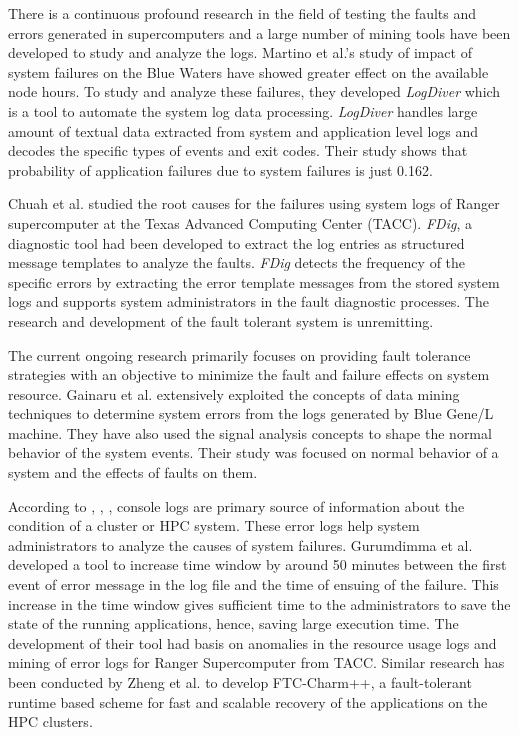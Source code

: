 \documentclass[10pt]{ruthesis}
\begin{document}
There is a continuous profound research in the field of testing the faults and errors generated in supercomputers and a large number of mining tools have been developed to study and analyze the logs. Martino et al.'s \cite{ref6} study of impact of system failures on the Blue Waters have showed greater effect on the available node hours. To study and analyze these failures, they developed \textit{LogDiver} which is a tool to automate the system log data processing. \textit{LogDiver} handles large amount of textual data extracted from system and application level logs and decodes the specific types of events and exit codes. Their study shows that probability of application failures due to system failures is just 0.162.

Chuah et al. \cite{ref9} studied the root causes for the failures using system logs of Ranger supercomputer at the Texas Advanced Computing Center (TACC). \textit{FDig}, a diagnostic tool had been developed to extract the log entries as structured message templates to analyze the faults. \textit{FDig} detects the frequency of the specific errors by extracting the error template messages from the stored system logs and supports system administrators in the fault diagnostic processes. The research and development of the fault tolerant system is unremitting. 

The current ongoing research primarily focuses on providing fault tolerance strategies with an objective to minimize the fault and failure effects on system resource. Gainaru et al. \cite{ref12} extensively exploited the concepts of data mining techniques to determine system errors from the logs generated by Blue Gene/L machine. They have also used the signal analysis concepts to shape the normal behavior of the system events. Their study was focused on normal behavior of a system and the effects of faults on them.

According to \cite{ref6}, \cite{ref9}, \cite{ref13}, console logs are primary source of information about the condition of a cluster or HPC system. These error logs help system administrators to analyze the causes of system failures. Gurumdimma et al. \cite{ref13} developed a tool to increase time window by around 50 minutes between the first event of error message in the log file and the time of ensuing of the failure. This increase in the time window gives sufficient time to the administrators to save the state of the running applications, hence, saving large execution time. The development of their tool had basis on anomalies in the resource usage logs and mining of error logs for Ranger Supercomputer from TACC. Similar research has been conducted by Zheng et al. \cite{ref15} to develop FTC-Charm++, a fault-tolerant runtime based scheme for fast and scalable recovery of the applications on the HPC clusters. 
\end{document}
